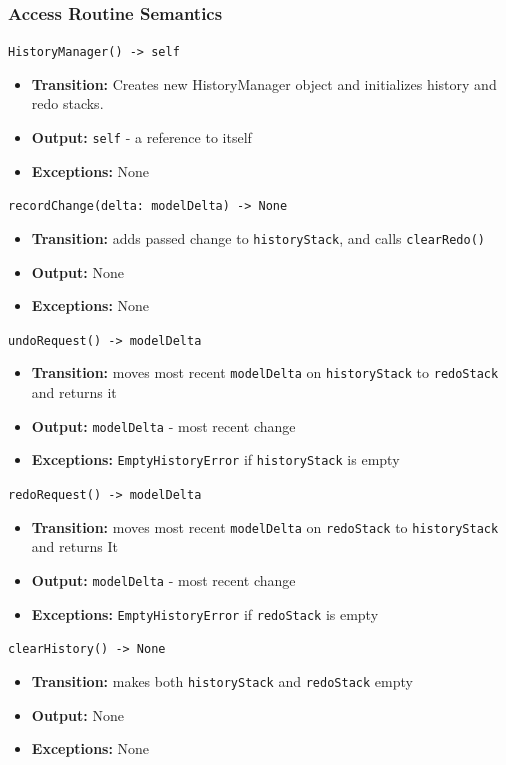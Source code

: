 \documentclass[12pt, titlepage]{article}
\begin{document}
\subsubsection{Access Routine Semantics}
\texttt{HistoryManager() -> self}
\begin{itemize}
  \item \textbf{Transition:} Creates new HistoryManager object and initializes history and redo stacks.
  \item \textbf{Output:} \texttt{self} - a reference to itself
  \item \textbf{Exceptions:} None
\end{itemize}
\texttt{recordChange(delta: modelDelta) -> None}
\begin{itemize}
  \item \textbf{Transition:} adds passed change to \texttt{historyStack}, and calls \texttt{clearRedo()}
  \item \textbf{Output:} None
  \item \textbf{Exceptions:} None
\end{itemize}
\texttt{undoRequest() -> modelDelta}
\begin{itemize}
  \item \textbf{Transition:} moves most recent \texttt{modelDelta} on \texttt{historyStack} to \texttt{redoStack} and returns it
  \item \textbf{Output:} \texttt{modelDelta} - most recent change
  \item \textbf{Exceptions:} \texttt{EmptyHistoryError} if \texttt{historyStack} is empty
\end{itemize}
\texttt{redoRequest() -> modelDelta}
\begin{itemize}
  \item \textbf{Transition:} moves most recent \texttt{modelDelta} on \texttt{redoStack} to \texttt{historyStack} and returns It
  \item \textbf{Output:} \texttt{modelDelta} - most recent change
  \item \textbf{Exceptions:} \texttt{EmptyHistoryError} if \texttt{redoStack} is empty
\end{itemize}
\texttt{clearHistory() -> None}
\begin{itemize}
  \item \textbf{Transition:} makes both \texttt{historyStack} and \texttt{redoStack} empty
  \item \textbf{Output:} None
  \item \textbf{Exceptions:} None
\end{itemize}
\end{document}
